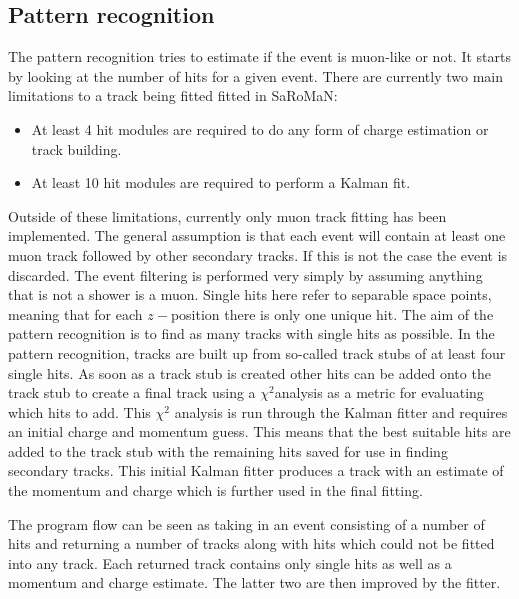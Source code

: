 \subsection{Pattern recognition}
The pattern recognition tries to estimate if the event is muon-like or not. It starts by looking at the number of hits for a given event. There are currently two main limitations to a track being fitted fitted in SaRoMaN:
\begin{itemize}
\item At least 4 hit modules are required to do any form of charge estimation or track building.
\item At least 10 hit modules are required to perform a Kalman fit.
\end{itemize}
Outside of these limitations, currently only muon track fitting has been implemented. The general assumption is that each event will contain at least one muon track followed by other secondary tracks. If this is not the case the event is discarded. The event filtering is performed very simply by assuming anything that is not a shower is a muon. Single hits here refer to separable space points, meaning that for each $z-$position there is only one unique hit. The aim of the pattern recognition is to find as many tracks with single hits as possible. In the pattern recognition, tracks are built up from so-called track stubs of at least four single hits. As soon as a track stub is created other hits can be added onto the track stub to create a final track using a $\chi^2$analysis as a metric for evaluating which hits to add. This $\chi^2$ analysis is run through the Kalman fitter and requires an initial charge and momentum guess. This means that the best suitable hits are added to the track stub with the remaining hits saved for use in finding secondary tracks. This initial Kalman fitter produces a track with an estimate of the momentum and charge which is further used in the final fitting.

The program flow can be seen as taking in an event consisting of a number of hits and returning a number of tracks along with hits which could not be fitted into any track. Each returned track contains only single hits as well as a momentum and charge estimate. The latter two are then improved by the fitter.


